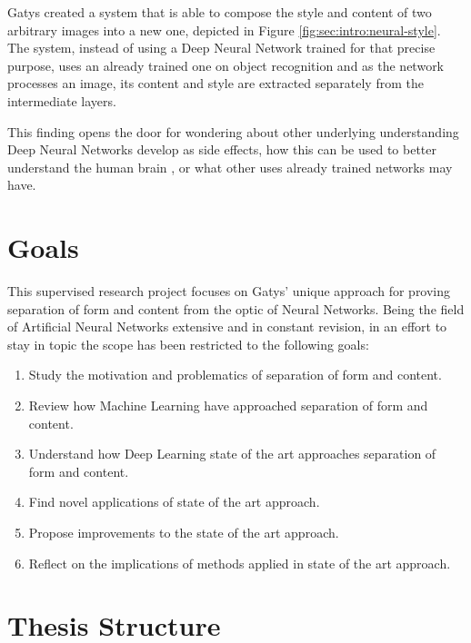 Gatys created a system that is able to compose the style and content of two arbitrary images into a new one, depicted in Figure \ref{fig:sec:intro:neural-style}.
The system, instead of using a Deep Neural Network trained for that precise purpose, uses an already trained one on object recognition and as the network processes an image, its content and style are extracted separately from the intermediate layers.

This finding opens the door for wondering about other underlying understanding Deep Neural Networks develop as side effects, how this can be used to better understand the human brain \cite{Yamins2016}, or what other uses already trained networks may have.



\section{Goals}
\label{sec:intro:goals}

This supervised research project focuses on Gatys' unique approach for proving separation of form and content from the optic of Neural Networks. Being the field of Artificial Neural Networks extensive and in constant revision, in an effort to stay in topic the scope has been restricted to the following goals:

\begin{enumerate}
  \item Study the motivation and problematics of separation of form and content.
  \item Review how Machine Learning have approached separation of form and content.
  \item Understand how Deep Learning state of the art approaches separation of form and content.
  \item Find novel applications of state of the art approach.
  \item Propose improvements to the state of the art approach.
  \item Reflect on the implications of methods applied in state of the art approach.
\end{enumerate}



\section{Thesis Structure}
\label{sec:intro:structure}


